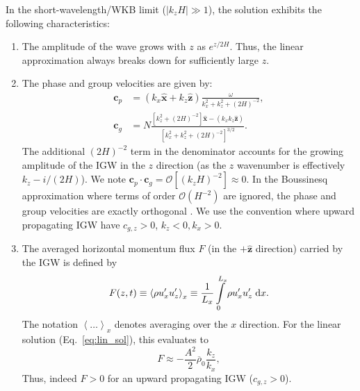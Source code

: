 \documentclass[
        fleqn,
        usenatbib,
    ]{mnras}
\newcommand*{\abs}[1]{\left|#1\right|}
\newcommand*{\ev}[1]{\left\langle#1\right\rangle}
\newcommand*{\p}[1]{\left(#1\right)}
\newcommand*{\s}[1]{\left[#1\right]}
\newcommand*{\bm}[1]{\mathbf{#1}}
\newcommand*{\uv}[1]{\hat{\mathbf{#1}}}
\begin{document}
In the short-wavelength/WKB limit ($\abs{k_{z}H} \gg 1$), the solution exhibits
the following characteristics:
\begin{enumerate}
    \item The amplitude of the wave grows with $z$ as $e^{z/2H}$. Thus, the
        linear approximation always breaks down for sufficiently large $z$.

    \item The phase and group velocities are given by:
        \begin{align}
            \bm{c}_{p} &=
                \p{k_{x}\uv{x} + k_{z}\uv{z}}\frac{\omega}
                {k_{x}^2 + k_{z}^2 + \p{2H}^{-2}},\\
            \bm{c}_{g} &= N\frac{\s{k_{z}^2 + \p{2H}^{-2}}\uv{x}
                - \p{k_{x}k_{z}\uv{z}}}
                {\s{k_{x}^2 + k_{z}^2 + \p{2H}^{-2}}^{3/2}}.\label{eq:vg}
        \end{align}
        \textcolor{Corr}{The additional $\p{2H}^{-2}$ term in the denominator
        accounts for the growing amplitude of the IGW in the $z$ direction (as
        the $z$ wavenumber is effectively $k_z - i / (2H)$).} We note
        $\bm{c}_{p} \cdot \bm{c}_g = \mathcal{O}\s{\p{k_{z}H}^{-2}} \approx 0$.
        In the Boussinesq approximation where terms of order
        $\mathcal{O}\p{H^{-2}}$ are ignored, the phase and group velocities are
        exactly orthogonal \citep{drazin,sutherland1}. We use the convention
        where upward propagating IGW have $c_{g, z} > 0$, $k_z < 0, k_x > 0$.

    \item The averaged horizontal momentum flux $F$ (in the $+\uv{z}$
        direction) carried by the IGW is defined by
        \begin{equation}
            F(z, t) \equiv \ev{\rho u_{x}' u_{z}'}_x \equiv
                \frac{1}{L_x}\int_0^{L_x}\limits \rho u_{x}'u_{z}'\;\mathrm{d}x.
                    \label{eq:F_def}
        \end{equation}
        The notation $\ev{\dots}_x$ denotes averaging over the $x$ direction.
        For the linear solution (Eq.~\ref{eq:lin_sol}), this evaluates to
        \begin{equation}
            F \approx -\frac{A^2}{2}\overline{\rho}_0\frac{k_{z}}{k_{x}},
                    \label{eq:S_lin}
        \end{equation}
        Thus, indeed $F > 0$ for an upward propagating IGW ($c_{g, z} > 0$).
\end{enumerate}
\end{document}
